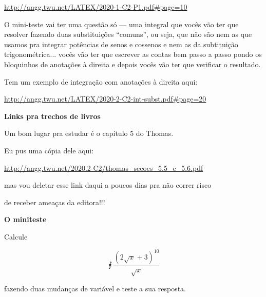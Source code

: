 \documentclass[oneside,12pt]{article}
\begin{document}
\ssk

\url{http://angg.twu.net/LATEX/2020-1-C2-P1.pdf\#page=10}

\newpage

O mini-teste vai ter uma questão só --- uma integral que vocês vão ter
que resolver fazendo duas substituições ``comuns'', ou seja, que não
são nem as que usamos pra integrar potências de senos e cossenos e nem
as da subtituição trigonométrica... vocês vão ter que escrever as
contas bem passo a passo pondo os bloquinhos de anotações à direita e
depois vocês vão ter que verificar o resultado.

\msk

Tem um exemplo de integração com anotações à direita aqui:

\ssk

\url{http://angg.twu.net/LATEX/2020-2-C2-int-subst.pdf\#page=20}



\newpage


{\bf Links pra trechos de livros}

Um bom lugar pra estudar é o capítulo 5 do Thomas.

Eu pus uma cópia dele aqui:

\ssk

{\footnotesize

\url{http://angg.twu.net/2020.2-C2/thomas_secoes_5.5_e_5.6.pdf}

}

\ssk

mas vou deletar esse link daqui a poucos dias pra não correr risco

de receber ameaças da editora!!!


\newpage


{\bf O miniteste}

Calcule

$$\intx {\frac{(2\sqrt{x} + 3)^{10}}{\sqrt{x}}} $$

fazendo duas mudanças de variável e teste a sua resposta.




\end{document}
